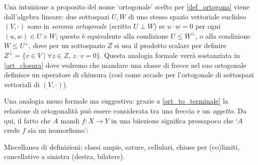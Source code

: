 \begin{remark}\label{perche_ortogonale}

 Una intuizione a proposito del nome `ortogonale' scelto per \ref{def_ortogona} viene dall'algebra lineare: due sottospazi \(U,W\) di uno stesso spazio vettoriale euclideo \((V,\cdot)\) sono in \emph{somma ortogonale} (scritto \(U\perp W\)) se \(u\cdot w=0\) per ogni \((u,w)\in U\times W\); questo è equivalente alla condizione \(U\le W^\perp\), o alla condizione \(W\le U^\perp\), dove per un sottospazio \(Z\) si usa il prodotto scalare per definire \(Z^\perp = \{v\in V\mid \forall z\in Z,\,z\cdot v=0\}\). Questa analogia formale verrà sostanziata in \ref{ort_closura} dove vedremo che mandare una classe di frecce nel suo ortogonale definisce un operatore di chiusura (così come accade per l'ortogonale di sottospazi vettoriali di \((V,\cdot)\)).

 Una analogia meno formale ma suggestiva: grazie a \ref{ort_to_terminale} la relazione di ortogonalità può essere considerata tra una freccia e un \emph{oggetto}. Da qui, il fatto che \(A\) mandi \(f \colon X \to Y\) in una biiezione significa pressapoco che `\(A\) crede \(f\) sia un isomorfismo':
\end{remark}
\begin{proposition}\label{prop_ortogonali_proprieta}
\end{proposition}
Miscellanea di definizioni: classi ampie, sature, cellulari, chiuse per (co)limiti, cancellative a sinistra (destra, bilatere).
